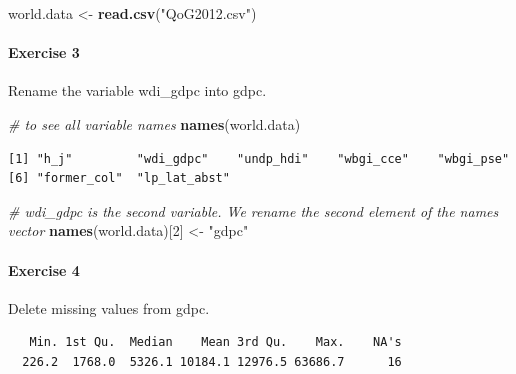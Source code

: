 \documentclass[]{article}
\newenvironment{Shaded}{\begin{snugshade}}{\end{snugshade}}
\newcommand{\KeywordTok}[1]{\textcolor[rgb]{0.13,0.29,0.53}{\textbf{#1}}}
\newcommand{\DecValTok}[1]{\textcolor[rgb]{0.00,0.00,0.81}{#1}}
\newcommand{\StringTok}[1]{\textcolor[rgb]{0.31,0.60,0.02}{#1}}
\newcommand{\CommentTok}[1]{\textcolor[rgb]{0.56,0.35,0.01}{\textit{#1}}}
\newcommand{\OperatorTok}[1]{\textcolor[rgb]{0.81,0.36,0.00}{\textbf{#1}}}
\newcommand{\NormalTok}[1]{#1}
\let\oldparagraph\paragraph
\renewcommand{\paragraph}[1]{\oldparagraph{#1}\mbox{}}
\theoremstyle{definition}
\theoremstyle{definition}
\theoremstyle{definition}
\theoremstyle{remark}
\begin{document}
\begin{Shaded}
\begin{Highlighting}[]
\NormalTok{world.data <-}\StringTok{ }\KeywordTok{read.csv}\NormalTok{(}\StringTok{"QoG2012.csv"}\NormalTok{)}
\end{Highlighting}
\end{Shaded}

\paragraph{Exercise 3}\label{exercise-3-2}

Rename the variable wdi\_gdpc into gdpc.

\begin{Shaded}
\begin{Highlighting}[]
\CommentTok{# to see all variable names}
\KeywordTok{names}\NormalTok{(world.data)}
\end{Highlighting}
\end{Shaded}

\begin{verbatim}
[1] "h_j"         "wdi_gdpc"    "undp_hdi"    "wbgi_cce"    "wbgi_pse"   
[6] "former_col"  "lp_lat_abst"
\end{verbatim}

\begin{Shaded}
\begin{Highlighting}[]
\CommentTok{# wdi_gdpc is the second variable. We rename the second element of the names vector}
\KeywordTok{names}\NormalTok{(world.data)[}\DecValTok{2}\NormalTok{] <-}\StringTok{ "gdpc"}
\end{Highlighting}
\end{Shaded}

\paragraph{Exercise 4}\label{exercise-4-2}

Delete missing values from gdpc.

\begin{Shaded}
\end{Shaded}

\begin{verbatim}
   Min. 1st Qu.  Median    Mean 3rd Qu.    Max.    NA's 
  226.2  1768.0  5326.1 10184.1 12976.5 63686.7      16 
\end{verbatim}
\end{document}
